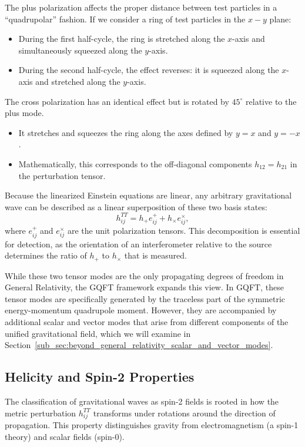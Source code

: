 The plus polarization affects the proper distance between test particles in a ``quadrupolar'' fashion. If we consider a ring of test particles in the $x-y$ plane:
\begin{itemize}
  \item During the first half-cycle, the ring is stretched along the $x$-axis and simultaneously squeezed along the $y$-axis.
  \item During the second half-cycle, the effect reverses: it is squeezed along the $x$-axis and stretched along the $y$-axis.
\end{itemize}

The cross polarization has an identical effect but is rotated by $45^\circ$ relative to the plus mode.
\begin{itemize}
  \item It stretches and squeezes the ring along the axes defined by $y = x$ and $y = -x$.
  \item Mathematically, this corresponds to the off-diagonal components $h_{12} = h_{21}$ in the perturbation tensor.
\end{itemize}

Because the linearized Einstein equations are linear, any arbitrary gravitational wave can be described as a linear superposition of these two basis states:
\[%
  h_{ij}^{TT} = h_+ e_{ij}^+ + h_\times e_{ij}^\times
,\]%
where $e_{ij}^+$ and $e_{ij}^\times$ are the unit polarization tensors. This decomposition is essential for detection, as the orientation of an interferometer relative to the source determines the ratio of $h_+$ to $h_\times$ that is measured.

While these two tensor modes are the only propagating degrees of freedom in General Relativity, the GQFT framework expands this view. In GQFT, these tensor modes are specifically generated by the traceless part of the symmetric energy-momentum quadrupole moment. However, they are accompanied by additional scalar and vector modes that arise from different components of the unified gravitational field, which we will examine in Section~\ref{sub_sec:beyond_general_relativity_scalar_and_vector_modes}.

\subsection{Helicity and Spin-2 Properties} The classification of gravitational waves as spin-2 fields is rooted in how the metric perturbation $h_{ij}^{TT}$ transforms under rotations around the direction of propagation. This property distinguishes gravity from electromagnetism (a spin-1 theory) and scalar fields (spin-0).

